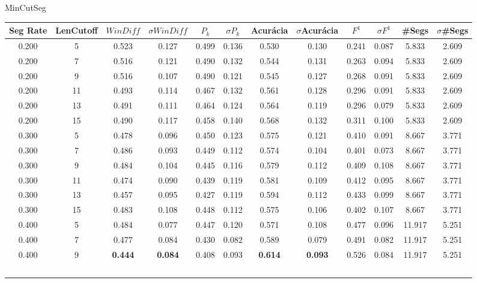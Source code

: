  \newpage
 \center MinCutSeg
\begin{longtable}[c]{|c|c|c|c|c|c|c|c|c|c|c|c|} 
\hline 
 Seg Rate & LenCutoff & $WinDiff$ & $\sigma$$WinDiff$ & $P_k$ & $\sigma$$P_k$ & Acurácia & $\sigma$Acurácia & $F^1$ & $\sigma$$F^1$ & \#Segs & $\sigma$\#Segs\\ \hline 
 0.200 & 5 & 0.523 & 0.127 & 0.499 & 0.136 & 0.530 & 0.130 & 0.241 & 0.087 & 5.833 & 2.609  \\ \hline 
  0.200 & 7 & 0.516 & 0.121 & 0.490 & 0.132 & 0.544 & 0.131 & 0.263 & 0.094 & 5.833 & 2.609  \\ \hline 
  0.200 & 9 & 0.516 & 0.107 & 0.490 & 0.121 & 0.545 & 0.127 & 0.268 & 0.091 & 5.833 & 2.609  \\ \hline 
  0.200 & 11 & 0.493 & 0.114 & 0.467 & 0.132 & 0.561 & 0.128 & 0.296 & 0.091 & 5.833 & 2.609  \\ \hline 
  0.200 & 13 & 0.491 & 0.111 & 0.464 & 0.124 & 0.564 & 0.119 & 0.296 & 0.079 & 5.833 & 2.609  \\ \hline 
  0.200 & 15 & 0.490 & 0.117 & 0.458 & 0.140 & 0.568 & 0.132 & 0.311 & 0.100 & 5.833 & 2.609  \\ \hline 
  0.300 & 5 & 0.478 & 0.096 & 0.450 & 0.123 & 0.575 & 0.121 & 0.410 & 0.091 & 8.667 & 3.771  \\ \hline 
  0.300 & 7 & 0.486 & 0.093 & 0.449 & 0.112 & 0.574 & 0.104 & 0.401 & 0.073 & 8.667 & 3.771  \\ \hline 
  0.300 & 9 & 0.484 & 0.104 & 0.445 & 0.116 & 0.579 & 0.112 & 0.409 & 0.108 & 8.667 & 3.771  \\ \hline 
  0.300 & 11 & 0.474 & 0.090 & 0.439 & 0.119 & 0.581 & 0.109 & 0.412 & 0.095 & 8.667 & 3.771  \\ \hline 
  0.300 & 13 & 0.457 & 0.095 & 0.427 & 0.119 & 0.594 & 0.112 & 0.433 & 0.099 & 8.667 & 3.771  \\ \hline 
  0.300 & 15 & 0.483 & 0.108 & 0.448 & 0.112 & 0.575 & 0.106 & 0.402 & 0.107 & 8.667 & 3.771  \\ \hline 
  0.400 & 5 & 0.484 & 0.077 & 0.447 & 0.120 & 0.571 & 0.108 & 0.477 & 0.096 & 11.917 & 5.251  \\ \hline 
  0.400 & 7 & 0.477 & 0.084 & 0.430 & 0.082 & 0.589 & 0.079 & 0.491 & 0.082 & 11.917 & 5.251  \\ \hline 
  0.400 & 9 & \cellcolor{gray!20} \textbf{0.444} & \cellcolor{gray!20} \textbf{0.084} & 0.408 & 0.093 & \cellcolor{gray!20} \textbf{0.614} & \cellcolor{gray!20} \textbf{0.093} & 0.526 & 0.084 & 11.917 & 5.251  \\ \hline 
$$
\end{longtable}
